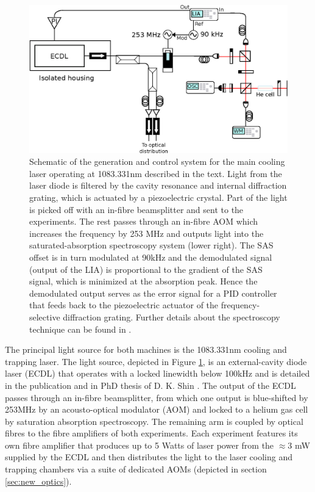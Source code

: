 	\begin{figure}
		\centering
		\includegraphics[width=\textwidth]{fig/apparatus/master_laser_system}
		\caption{Schematic of the generation and control system for the main cooling laser operating at 1083.331nm described in the text. Light from the laser diode is filtered by the cavity resonance and internal diffraction grating, which is actuated by a piezoelectric crystal. Part of the light is picked off with an in-fibre beamsplitter and sent to the experiments. The rest passes through an in-fibre AOM which increases the frequency by 253 MHz and outputs light into the saturated-absorption spectroscopy system (lower right). The SAS offset is in turn modulated at 90kHz and the demodulated signal (output of the LIA) is proportional to the gradient of the SAS signal, which is minimized at the absorption peak. Hence the demodulated output serves as the error signal for a PID controller that feeds back to the piezoelectric actuator of the frequency-selective diffraction grating. Further details about the spectroscopy technique can be found in \cite{ShinThesis,FootAtomic}.}
		\label{fig:main_laser}
	\end{figure}
	
	
	The principal light source for both machines is the 1083.331nm cooling and trapping laser.
	The light source, depicted in Figure \ref{fig:main_laser}, is an external-cavity diode laser (ECDL) that operates with a locked linewidth below 100kHz and is detailed in the publication \cite{Shin16} and in PhD thesis of D. K. Shin \cite{ShinThesis}.
	The output of the ECDL passes through an in-fibre beamsplitter, from which one output is blue-shifted by 253MHz by an acousto-optical modulator (AOM) and locked to a helium gas cell by saturation absorption spectroscopy.
	The remaining arm is coupled by optical fibres to the fibre amplifiers of both experiments.
	Each experiment features its own fibre amplifier that produces up to 5 Watts of laser power from the $\approx$3 mW supplied by the ECDL and then distributes the light to the laser cooling and trapping chambers via a suite of dedicated AOMs (depicted in section \ref{sec:new_optics}).

